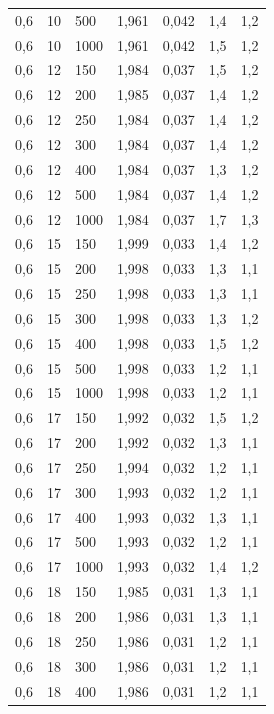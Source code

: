 \begin{tabular}{lllllll}
        0,6 & 10 & 500 & 1,961 & 0,042 & 1,4 & 1,2 \\ 
        0,6 & 10 & 1000 & 1,961 & 0,042 & 1,5 & 1,2 \\ 
        0,6 & 12 & 150 & 1,984 & 0,037 & 1,5 & 1,2 \\ 
        0,6 & 12 & 200 & 1,985 & 0,037 & 1,4 & 1,2 \\ 
        0,6 & 12 & 250 & 1,984 & 0,037 & 1,4 & 1,2 \\ 
        0,6 & 12 & 300 & 1,984 & 0,037 & 1,4 & 1,2 \\ 
        0,6 & 12 & 400 & 1,984 & 0,037 & 1,3 & 1,2 \\ 
        0,6 & 12 & 500 & 1,984 & 0,037 & 1,4 & 1,2 \\ 
        0,6 & 12 & 1000 & 1,984 & 0,037 & 1,7 & 1,3 \\ 
        0,6 & 15 & 150 & 1,999 & 0,033 & 1,4 & 1,2 \\ 
        0,6 & 15 & 200 & 1,998 & 0,033 & 1,3 & 1,1 \\ 
        0,6 & 15 & 250 & 1,998 & 0,033 & 1,3 & 1,1 \\ 
        0,6 & 15 & 300 & 1,998 & 0,033 & 1,3 & 1,2 \\ 
        0,6 & 15 & 400 & 1,998 & 0,033 & 1,5 & 1,2 \\ 
        0,6 & 15 & 500 & 1,998 & 0,033 & 1,2 & 1,1 \\ 
        0,6 & 15 & 1000 & 1,998 & 0,033 & 1,2 & 1,1 \\ 
        0,6 & 17 & 150 & 1,992 & 0,032 & 1,5 & 1,2 \\ 
        0,6 & 17 & 200 & 1,992 & 0,032 & 1,3 & 1,1 \\ 
        0,6 & 17 & 250 & 1,994 & 0,032 & 1,2 & 1,1 \\ 
        0,6 & 17 & 300 & 1,993 & 0,032 & 1,2 & 1,1 \\ 
        0,6 & 17 & 400 & 1,993 & 0,032 & 1,3 & 1,1 \\ 
        0,6 & 17 & 500 & 1,993 & 0,032 & 1,2 & 1,1 \\ 
        0,6 & 17 & 1000 & 1,993 & 0,032 & 1,4 & 1,2 \\ 
        0,6 & 18 & 150 & 1,985 & 0,031 & 1,3 & 1,1 \\ 
        0,6 & 18 & 200 & 1,986 & 0,031 & 1,3 & 1,1 \\ 
        0,6 & 18 & 250 & 1,986 & 0,031 & 1,2 & 1,1 \\ 
        0,6 & 18 & 300 & 1,986 & 0,031 & 1,2 & 1,1 \\ 
        0,6 & 18 & 400 & 1,986 & 0,031 & 1,2 & 1,1 \\ 

\end{tabular}
